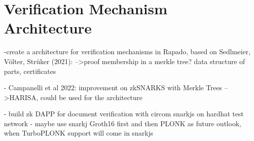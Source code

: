 \section{Verification Mechanism Architecture}
-create a architecture for verification mechanisms in Rapado, based on Sedlmeier, Völter, Strüker (2021):
-->proof membership in a merkle tree? data structure of parts, certificates

- Campanelli et al 2022: improvement on zkSNARKS with Merkle Trees -->HARISA, could be used for the architecture

- build zk DAPP for document verification with circom snarkjs on hardhat test network
- maybe use snarkj Groth16 first and then PLONK as future outlook, when TurboPLONK support will come in snarkjs
